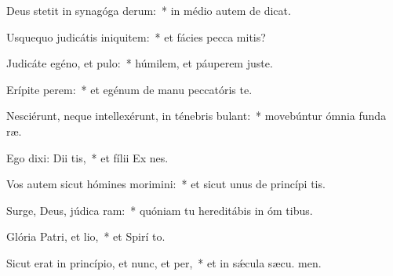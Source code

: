 \item Deus stetit in synagóga derum:~* in médio autem de dicat.
\item Usquequo judicátis iniquitem:~* et fácies pecca mitis?
\item Judicáte egéno, et pulo:~* húmilem, et páuperem juste.
\item Erípite perem:~* et egénum de manu peccatóris te.
\item Nesciérunt, neque intellexérunt, in ténebris bulant:~* movebúntur ómnia funda ræ.
\item Ego dixi: Dii tis,~* et fílii Ex nes.
\item Vos autem sicut hómines morimini:~* et sicut unus de princípi tis.
\item Surge, Deus, júdica ram:~* quóniam tu hereditábis in óm tibus.
\item Glória Patri, et lio,~* et Spirí to.
\item Sicut erat in princípio, et nunc, et per,~* et in sǽcula sæcu. men.
